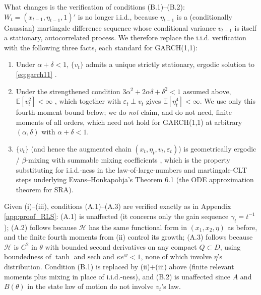 What changes is the verification of conditions (B.1)--(B.2): $W_t=(x_{t-1},\eta_{t-1},1)'$ is no
longer i.i.d., because $\eta_{t-1}$ is a (conditionally Gaussian) martingale difference sequence whose
conditional variance $v_{t-1}$ is itself a stationary, autocorrelated process. We therefore replace the
i.i.d. verification with the following three facts, each standard for GARCH(1,1):
\begin{enumerate}
\item[(i)] Under $\alpha+\delta<1$, $\{v_t\}$ admits a unique strictly stationary, ergodic solution to
\eqref{eq:garch11} \citep{BougerolPicard1992,Nelson1990}.
\item[(ii)] Under the strengthened condition $3\alpha^2+2\alpha\delta+\delta^2<1$ assumed above,
$\mathbb E[v_t^2]<\infty$ \citep{Bollerslev1986}, which together with $\varepsilon_t\perp v_t$ gives
$\mathbb E[\eta_t^4]<\infty$. We use only this fourth-moment bound below; we do \emph{not} claim, and
do not need, finite moments of all orders, which need not hold for GARCH(1,1) at arbitrary
$(\alpha,\delta)$ with $\alpha+\delta<1$.
\item[(iii)] $\{v_t\}$ (and hence the augmented chain $(x_t,\eta_t,v_t,\varepsilon_t)$) is geometrically
ergodic / $\beta$-mixing with summable mixing coefficients \citep{CarrascoChen2002}, which is the
property substituting for i.i.d.-ness in the law-of-large-numbers and martingale-CLT steps underlying
Evans--Honkapohja's Theorem 6.1 (the ODE approximation theorem for SRA).
\end{enumerate}
Given (i)--(iii), conditions (A.1)--(A.3) are verified exactly as in Appendix \ref{app:proof_RLS}: (A.1)
is unaffected (it concerns only the gain sequence $\gamma_t=t^{-1}$); (A.2) follows because $\mathcal H$
has the same functional form in $(x_1,x_2,\eta)$ as before, and the finite fourth moments from (ii)
control its growth; (A.3) follows because $\mathcal H$ is $C^2$ in $\theta$ with bounded second
derivatives on any compact $Q\subset D$, using boundedness of $\tanh$ and $\mathrm{sech}$ and
$\kappa e^w<1$, none of which involve $\eta$'s distribution. Condition (B.1) is replaced by (ii)+(iii)
above (finite relevant moments plus mixing in place of i.i.d.-ness), and (B.2) is unaffected since $A$
and $B(\theta)$ in the state law of motion do not involve $v_t$'s law.

